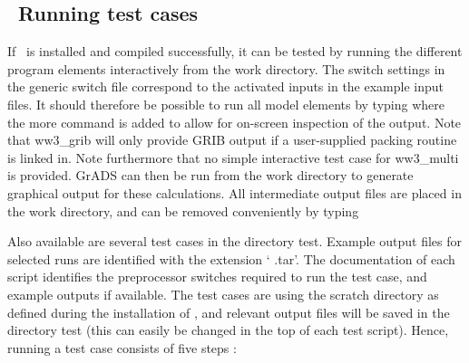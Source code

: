 \vssub
\subsection{~Running test cases} \label{sec:tests}
\vssub

If \ws\ is installed and compiled successfully, it can be tested by running
the different program elements interactively from the {\file work}
directory. The switch settings in the generic switch file correspond to the
activated inputs in the example input files. It should therefore be possible
to run all model elements by typing
where the {\code more} command is added to allow for on-screen inspection of
the output. Note that {\code ww3\_grib} will only provide GRIB output if a
user-supplied packing routine is linked in. Note furthermore that no simple
interactive test case for {\file ww3\_multi} is provided. GrADS can then be
run from the work directory to generate graphical output for these
calculations. All intermediate output files are placed in the {\file work}
directory, and can be removed conveniently by typing 

Also available are several test cases in the directory {\dir test}. Example
output files for selected runs are identified with the extension `{\file
.tar}'. The documentation of each script identifies the preprocessor switches
required to run the test case, and example outputs if available. The test
cases are using the scratch directory as defined during the installation of
\ws, and relevant output files will be saved in the directory {\dir test}
(this can easily be changed in the top of each test script). Hence, running a
test case consists of five steps :

